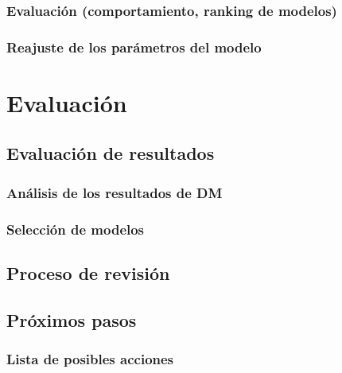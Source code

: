 \documentclass[11pt,a4paper,twoside]{tesis}
\begin{document}
\subsection{Evaluación (comportamiento, ranking de modelos)}
\subsection{Reajuste de los parámetros del modelo}

\chapter{Evaluación}
\section{Evaluación de resultados}
\subsection{Análisis de los resultados de DM}
\subsection{Selección de modelos}
\section{Proceso de revisión}
\section{Próximos pasos}
\subsection{Lista de posibles acciones}
\end{document}
